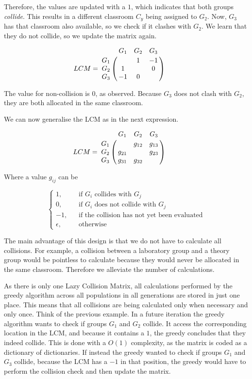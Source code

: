 Therefore, the values are updated with a $1$, which indicates that both groups \textit{collide}. This results in a different classroom $C_{y}$ being assigned to $G_{2}$. Now, $G_{3}$ has that classroom also available, so we check if it clashes with $G_{2}$. We learn that they do not collide, so we update the matrix again.

\begin{equation}
    LCM = \bordermatrix{
        & G_{1} & G_{2} & G_{3} \cr
        G_{1} &  & 1 & -1 \cr
        G_{2} & 1 &  & 0 \cr
        G_{3} & -1 & 0 & 
    } \qquad
\end{equation}

The value for non-collision is $0$, as observed. Because $G_{3}$ does not clash with $G_{2}$, they are both allocated in the same classroom.

We can now generalise the LCM as in the next expression.

\begin{equation}
    LCM = \bordermatrix{
        & G_{1} & G_{2} & G_{3} \cr
        G_{1} &  & g_{12} & g_{13} \cr
        G_{2} & g_{21} &  & g_{23} \cr
        G_{3} & g_{31} & g_{32} & 
    } \qquad
\end{equation}

Where a value $g_{ij}$ can be

\[
    \begin{cases}
        1\text{,} &\quad\text{if $G_{i}$ collides with $G_{j}$}\\
        0\text{,} &\quad\text{if $G_{i}$ does not collide with $G_{j}$}\\
        -1\text{,} &\quad\text{if the collision has not yet been evaluated}\\
        \epsilon\text{,} &\quad\text{otherwise}
    \end{cases}
\]

The main advantage of this design is that we do not have to calculate all collisions. For example, a collision between a laboratory group and a theory group would be pointless to calculate because they would never be allocated in the same classroom. Therefore we alleviate the number of calculations. 

As there is only one Lazy Collision Matrix, all calculations performed by the greedy algorithm across all populations in all generations are stored in just one place. This means that all collisions are being calculated only when necessary and only once. Think of the previous example. In a future iteration the greedy algorithm wants to check if groups $G_{1}$ and $G_{2}$ collide. It access the corresponding location in the LCM, and because it contains a $1$, the greedy concludes that they indeed collide. This is done with a $O(1)$ complexity, as the matrix is coded as a dictionary of dictionaries. If instead the greedy wanted to check if groups $G_{1}$ and $G_{3}$ collide, because the LCM has a $-1$ in that position, the greedy would have to perform the collision check and then update the matrix.



